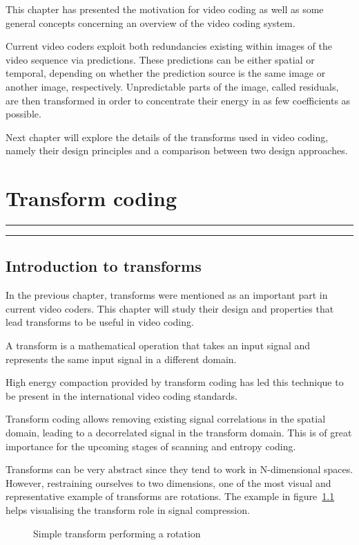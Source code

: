 \documentclass[11pt,a4paper,openright,twoside]{book}
\providecommand{\chaptertoc}{
	\startcontents[chapters]
	\hrule
	\vspace{1em}
	\printcontents[chapters]{}{1}{{\bf\large Contents}}
	\hrule
}
\numberwithin{equation}{section} %
\begin{document}
This chapter has presented the motivation for video coding as well as
some general concepts concerning an overview of the video coding system.

Current video coders exploit both redundancies existing within images of
the video sequence via predictions.
These predictions can be either spatial or temporal, depending on
whether the prediction source is the same image or another image,
respectively.
Unpredictable parts of the image, called residuals, are then transformed
in order to concentrate their energy in as few coefficients as possible.

Next chapter will explore the details of the transforms used in video
coding, namely their design principles and a comparison between two
design approaches.

\chapter{Transform coding}
\label{cha:transform_coding}
\chaptertoc

\section{Introduction to transforms}
\label{sec:introduction_to_transforms}

In the previous chapter, transforms were mentioned as an important part
in current video coders.
This chapter will study their design and properties that lead transforms
to be useful in video coding.

A transform is a mathematical operation that takes an input signal and
represents the same input signal in a different domain.

High energy compaction provided by transform coding has led this
technique to be present in the international video coding standards.

Transform coding allows removing existing signal correlations in the
spatial domain, leading to a decorrelated signal in the transform
domain.
This is of great importance for the upcoming stages of scanning and
entropy coding.

Transforms can be very abstract since they tend to work in N-dimensional
spaces.
However, restraining ourselves to two dimensions, one of the most visual
and representative example of transforms are rotations.
The example in figure~\ref{fig:transform_rotation} helps visualising the
transform role in signal compression.

\begin{figure}[tb]
	\centering
	
	\caption{Simple transform performing a rotation}
	\label{fig:transform_rotation}
\end{figure}
\end{document}
